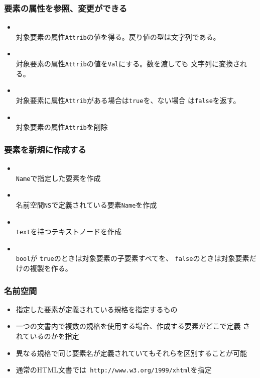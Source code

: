 \documentclass[dvipsk]{beamer}
\begin{document}
\begin{frame}[containsverbatim]
 \frametitle{要素の属性を参照、変更ができる}
\begin{itemize}
 \item {} \\
     対象要素の属性\texttt{Attrib}の値を得る。戻り値の型は文字列である。
 \item {} \\
     対象要素の属性\texttt{Attrib}の値を\texttt{Val}にする。数を渡しても
	  文字列に変換される。
 \item {} \\
     対象要素に属性\texttt{Attrib}がある場合は\texttt{true}を、ない場合
 は\texttt{false}を返す。
 \item {}\\
     対象要素の属性\texttt{Attrib}を削除
\end{itemize}
\end{frame}
\begin{frame}[containsverbatim]
 \frametitle{要素を新規に作成する}
\begin{itemize}
 \item {} \\
     \texttt{Name}で指定した要素を作成
 \item {} \\
     {名前空間}\texttt{NS}で定義されている要素\texttt{Name}を作成
 \item {}\\
     \texttt{text}を持つテキストノードを作成
 \item {} \\
\texttt{bool}が  \texttt{true}のときは対象要素の子要素すべてを、%
  \texttt{false}のときは対象要素だけの複製を作る。
\end{itemize}
\end{frame}
\begin{frame}[containsverbatim]
 \frametitle{名前空間}
\begin{itemize}
 \item 指定した要素が定義されている規格を指定するもの
 \item 一つの文書内で複数の規格を使用する場合、作成する要素がどこで定義
されているのかを指定
 \item 異なる規格で同じ要素名が定義されていてもそれらを区別することが可能
 \item 通常のHTML文書では\texttt{ http://www.w3.org/1999/xhtml}を指定
\end{itemize}
\end{frame}
\end{document}
